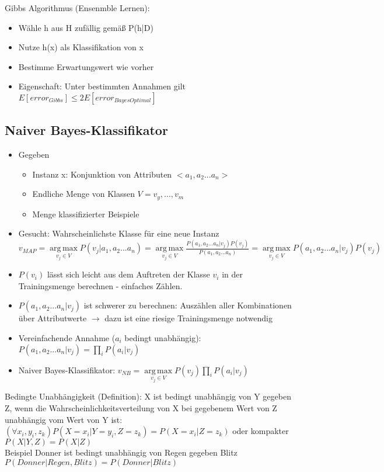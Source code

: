 \documentclass[paper=a4, fontsize=11pt]{scrartcl} %
\numberwithin{equation}{section} %
\numberwithin{figure}{section} %
\numberwithin{table}{section} %
\DeclareMathOperator*{\argmax}{arg\,max}
\begin{document}
Gibbs Algorithmus (Ensenmble Lernen):
\begin{itemize}
\item Wähle h aus H zufällig gemäß P(h|D)
\item Nutze h(x) als Klassifikation von x
\item Bestimme Erwartungswert wie vorher
\item Eigenschaft: Unter bestimmten Annahmen gilt $E[error_{Gibbs}] \le 2E[error_{BayesOptimal}]$
\end{itemize}

\subsection{Naiver Bayes-Klassifikator}

\begin{itemize}
\item Gegeben
\begin{itemize}
\item Instanz x: Konjunktion von Attributen $<a_1,a_2...a_n>$
\item Endliche Menge von Klassen $V = {v_y,...,v_m}$
\item Menge klassifizierter Beispiele
\end{itemize}
\item Gesucht: Wahrscheinlichste Klasse für eine neue Instanz\\ 
$v_{MAP} = \argmax\limits_{v_j \in V} P(v_j|a_1,a_2...a_n) = \argmax\limits_{v_j\in V} \frac{P(a_1,a_2...a_n|v_j)P(v_j)}{P(a_1,a_2...a_n)} = \argmax\limits_{v_j \in V} P(a_1,a_2...a_n|v_j)P(v_j)$
\item $P(v_i)$ lässt sich leicht aus dem Auftreten der Klasse $v_i$ in der Trainingsmenge berechnen - einfaches Zählen.
\item $P(a_1,a_2...a_n|v_j)$ ist schwerer zu berechnen: Auszählen aller Kombinationen über Attributwerte $\rightarrow$ dazu ist eine riesige Trainingsmenge notwendig
\item Vereinfachende Annahme ($a_i$ bedingt unabhängig): $P(a_1,a_2...a_n|v_j) = \prod\limits_i P(a_i|v_j)$
\item Naiver Bayes-Klassifikator: $v_{NB} = \argmax\limits_{v_j \in V} P(v_j) \prod\limits_i  P(a_i|v_j)$
\end{itemize}

Bedingte Unabhängigkeit (Definition): X ist bedingt unabhängig von Y gegeben Z, wenn die Wahrscheinlichkeitsverteilung von X bei gegebenem Wert von Z unabhängig vom Wert von Y ist: $(\forall x_i, y_i, z_k) P(X=x_i|Y=y_i,Z=z_k) = P(X=x_i|Z=z_k)$ oder kompakter $P(X|Y,Z) = P(X|Z)$\\ 
Beispiel Donner ist bedingt unabhängig von Regen gegeben Blitz $P(Donner|Regen,Blitz) = P(Donner|Blitz)$
\end{document}
